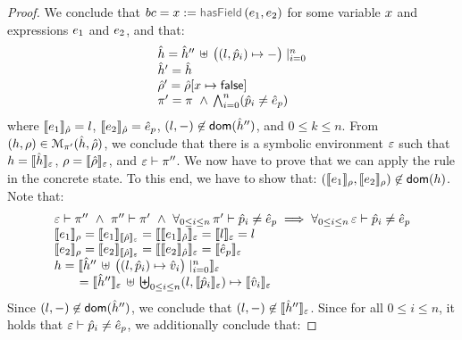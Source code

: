\begin{proof}
\noindent{}
We conclude that  $\bcmd = \jvar := \hasfield(\jsilexpr_1, \jsilexpr_2)$ for some variable $\jvar$ and expressions $\jsilexpr_1$ and $\jsilexpr_2$, and that: 
$$
\begin{array}{l}
  \sheap =  \sheap'' \, \uplus \, \big((l, \sexprp_i) \mapsto -\big)\mid_{i = 0}^n      \\
  \sheap' =  \sheap \\
  \sstore' = \sstore[\jvar \mapsto \jfalse] \\ 
     \pc' = \pc \ \wedge \,  \bigwedge_{i = 0}^n (\sexprp_i \neq \sexpr_p) 
\end{array}
$$ 
where $\symbeval{\jsilexpr_1}{\sstore} =  \loc$, $\symbeval{\jsilexpr_2}{\sstore} =  \sexpr_p$, 
$(\loc, -) \not\in \domain(\sheap'')$, and $0 \leq k \leq n$. 
%
From $(\heap, \store) \in \smodels{\sheap, \sstore}{\pc'}$, we conclude that there is a symbolic environment
$\senv$ such that $\heap = \semexpr{\sheap}{\senv}$, $\store = \semexpr{\sstore}{\senv}$, and 
$\senv \vdash \pc''$. 
We now have to prove that we can apply the  rule in the concrete state.
To this end, we have to show that: $(\symbeval{\jsilexpr_1}{\store}, \symbeval{\jsilexpr_2}{\store}) \not\in \domain(\heap)$. 
Note that: 
$$
\begin{array}{l}
%
\senv \vdash \pc'' \ \wedge \ \pc'' \vdash \pc' \ \wedge \ \forall_{0 \leq i \leq n}  \, \pc' \vdash \sexprp_i \neq \sexpr_p  
      \implies \forall_{0 \leq i \leq n}  \, \senv \vdash \sexprp_i \neq \sexpr_p  \\
%
 \symbeval{\jsilexpr_1}{\store} = \symbeval{\jsilexpr_1}{\symbeval{\sstore}{\senv}} = \symbeval{\symbeval{\jsilexpr_1}{\sstore}}{\senv} 
    = \symbeval{\loc}{\senv} = \loc \\ 
  \symbeval{\jsilexpr_2}{\store}  = \symbeval{\jsilexpr_2}{\semexpr{\sstore}{\senv}} =  \symbeval{\symbeval{\jsilexpr_2}{\sstore}}{\senv}
   =  \symbeval{\sexpr_p}{\senv} \\
 \heap = \semexpr{\sheap'' \, \uplus \, \big((l, \sexprp_i) \mapsto \sexprv_i\big)\mid_{i = 0}^n}{\senv} \\
    \qquad = \semexpr{\sheap''}{\senv} \dunion \biguplus_{0 \leq i \leq n} (l, \semexpr{\sexprp_i}{\senv}) \mapsto \semexpr{\sexprv_i}{\senv}
\end{array}
$$
Since $(\loc, -) \not\in \domain(\sheap'')$, we conclude that $(\loc, -) \not\in \semexpr{\sheap''}{\senv}$. 
%
Since for all ${0 \leq i \leq n}$, it holds that $\senv \vdash \sexprp_i \neq \sexpr_p$, we additionally conclude that: 

\end{proof}
